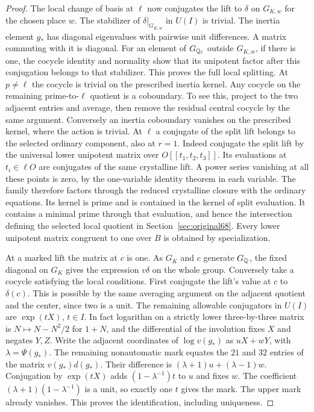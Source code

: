 \documentclass[a4paper,11pt]{article}
\theoremstyle{definition}
\theoremstyle{remark}
\numberwithin{equation}{section}
\begin{document}
\begin{proof}
The local change of basis at \(\ell\) now conjugates the lift
to \(\delta\) on \(G_{K,w}\) for the chosen place \(w\).
The stabilizer of \(\delta|_{G_{K,w}}\) in \(U(I)\) is trivial.
The inertia element \(g_*\) has diagonal eigenvalues with pairwise
unit differences. A matrix commuting with it is diagonal.
For an element of \(G_{\mathbb Q_\ell}\) outside \(G_{K,w}\), if
there is one, the cocycle identity and normality show that its
unipotent factor after this conjugation belongs to that
stabilizer. This proves the full local splitting. At \(p\ne\ell\)
the cocycle is trivial on the prescribed inertia kernel.
Any cocycle on the remaining prime-to-\(\ell\) quotient
is a coboundary. To see this, project to the two adjacent
entries and average, then remove the residual central cocycle
by the same argument. Conversely an inertia coboundary vanishes
on the prescribed kernel, where the action is trivial. At \(\ell\)
a conjugate of the split lift belongs to the selected ordinary
component, also at \(r=1\). Indeed conjugate the split lift by
the universal lower unipotent matrix over \(O[[t_1,t_2,t_3]]\).
Its evaluations at \(t_i\in\ell O\) are conjugates of the same
crystalline lift. A power series vanishing at all these points
is zero, by the one-variable identity theorem in each variable.
The family therefore factors through the reduced crystalline
closure with the ordinary equations. Its kernel is prime and
is contained in the kernel of split evaluation. It contains
a minimal prime through that evaluation, and hence the
intersection defining the selected local quotient in
Section~\ref{sec:original68}. Every lower unipotent matrix
congruent to one over \(B\) is obtained by specialization.

At a marked lift the matrix at \(c\) is one. As \(G_K\) and \(c\)
generate \(G_\mathbb Q\), the fixed diagonal on \(G_K\) gives the expression
\(v\delta\) on the whole group. Conversely take a cocycle
satisfying the local conditions. First conjugate the lift's value at
\(c\) to \(\delta(c)\). This is possible by the same averaging
argument on the adjacent quotient and the center, since two is
a unit. The remaining allowable conjugators in \(U(I)\) are
\(\exp(tX)\), \(t\in I\). In fact logarithm on a strictly lower
three-by-three matrix is \(N\mapsto N-N^2/2\) for \(1+N\),
and the differential of the involution fixes \(X\) and negates
\(Y,Z\). Write the adjacent coordinates of \(\log v(g_*)\) as
\(uX+wY\), with \(\lambda=\Psi(g_*)\). The remaining nonautomatic
mark equates the \(21\) and \(32\) entries of the matrix
\(v(g_*)d(g_*)\). Their difference is
\((\lambda+1)u+(\lambda-1)w\). Conjugation by \(\exp(tX)\)
adds \((1-\lambda^{-1})t\) to \(u\) and fixes \(w\).
The coefficient \((\lambda+1)(1-\lambda^{-1})\) is a unit,
so exactly one \(t\) gives the mark. The upper mark already
vanishes. This proves the identification, including uniqueness.
\end{proof}
\end{document}
